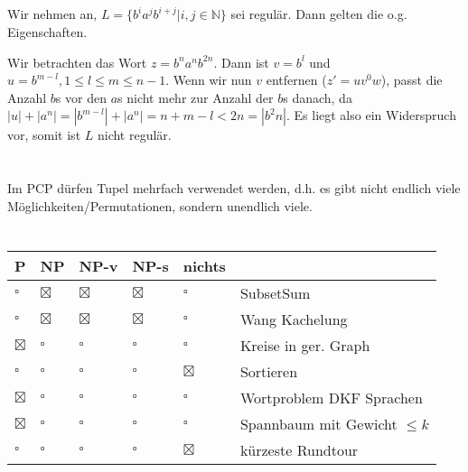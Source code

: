 \documentclass{article}
\begin{document}
\subsection{}%
Wir nehmen an, $L = \{b^ia^jb^{i+j} | i,j\in \mathbb{N}\}$ sei regulär. Dann gelten die o.g. Eigenschaften.

Wir betrachten das Wort $z = b^na^nb^{2n}$. Dann ist $v = b^l$ und $u = b^{m-l}, 1 \leq l \leq m \leq n-1$. Wenn wir nun $v$ entfernen ($z' = uv^0w$), passt die Anzahl $b$s vor den $a$s nicht mehr zur Anzahl der $b$s danach, da $|u|+|a^n| = |b^{m-l}|+|a^n| = n+m-l < 2n = |b^2n|$. Es liegt also ein Widerspruch vor, somit ist $L$ nicht regulär.

\section{}%
Im PCP dürfen Tupel mehrfach verwendet werden, d.h. es gibt nicht endlich viele Möglichkeiten/Permutationen, sondern unendlich viele.

\section{}%
\begin{center}
\begin{tabularx}{\textwidth}{lllll|X}
P & NP & NP-v & NP-s & nichts & \\
\hline
$\square$ & $\boxtimes$ & $\boxtimes$ & $\boxtimes$ & $\square$ & SubsetSum \\
$\square$ & $\boxtimes$ & $\boxtimes$ & $\boxtimes$ & $\square$ & Wang Kachelung \\
$\boxtimes$ & $\square$ & $\square$ & $\square$ & $\square$ & Kreise in ger. Graph \\
$\square$ & $\square$ & $\square$ & $\square$ & $\boxtimes$ & Sortieren \\
$\boxtimes$ & $\square$ & $\square$ & $\square$ & $\square$ & Wortproblem DKF Sprachen \\
$\boxtimes$ & $\square$ & $\square$ & $\square$ & $\square$ & Spannbaum mit Gewicht $\leq k$ \\
$\square$ & $\square$ & $\square$ & $\square$ & $\boxtimes$ & kürzeste Rundtour \\
\end{tabularx}
\end{center}

\section{}%
\end{document}
